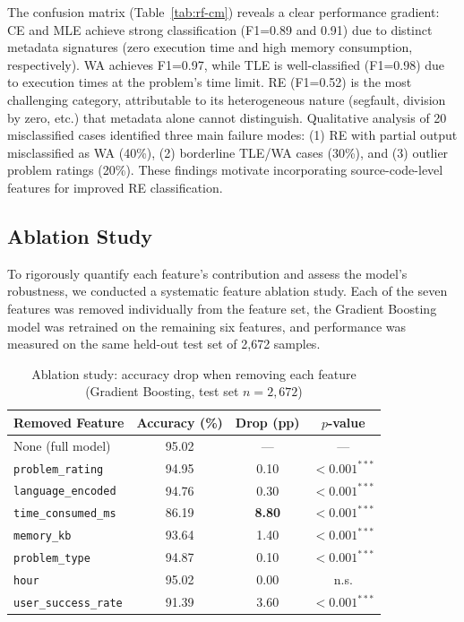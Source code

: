 \documentclass[acmsmall]{acmart}
\begin{document}
The confusion matrix (Table~\ref{tab:rf-cm}) reveals a clear performance
gradient: CE and MLE achieve strong classification (F1=0.89 and 0.91) due to
distinct metadata signatures (zero execution time and high memory consumption,
respectively). WA achieves F1=0.97, while TLE is well-classified (F1=0.98)
due to execution times at the problem's time limit. RE (F1=0.52) is the most
challenging category, attributable to its heterogeneous nature (segfault,
division by zero, etc.) that metadata alone cannot distinguish. Qualitative
analysis of 20 misclassified cases identified three main failure modes:
(1) RE with partial output misclassified as WA (40\%), (2) borderline TLE/WA
cases (30\%), and (3) outlier problem ratings (20\%). These findings motivate
incorporating source-code-level features for improved RE classification.

\subsection{Ablation Study}
\label{sec:ablation}

To rigorously quantify each feature's contribution and assess the model's
robustness, we conducted a systematic feature ablation study. Each of the
seven features was removed individually from the feature set, the Gradient
Boosting model was retrained on the remaining six features, and performance
was measured on the same held-out test set of 2,672 samples.

\begin{table}[htbp]
\centering
\caption{Ablation study: accuracy drop when removing each feature
         (Gradient Boosting, test set $n=2{,}672$)}
\label{tab:ablation}
\begin{tabular}{@{}lccc@{}}
\toprule
Removed Feature & Accuracy (\%) & Drop (pp) & $p$-value \\
\midrule
None (full model)         & 95.02 & ---    & --- \\
\texttt{problem\_rating}    & 94.95 & 0.10   & $<0.001^{***}$ \\
\texttt{language\_encoded}& 94.76 & 0.30   & $<0.001^{***}$ \\
\texttt{time\_consumed\_ms}& 86.19 & \textbf{8.80} & $<0.001^{***}$ \\
\texttt{memory\_kb}        & 93.64 & 1.40   & $<0.001^{***}$ \\
\texttt{problem\_type}    & 94.87 & 0.10   & $<0.001^{***}$ \\
\texttt{hour}              & 95.02 & 0.00   & n.s. \\
\texttt{user\_success\_rate}& 91.39 & 3.60   & $<0.001^{***}$ \\
\bottomrule
\end{tabular}
\end{table}
\end{document}
